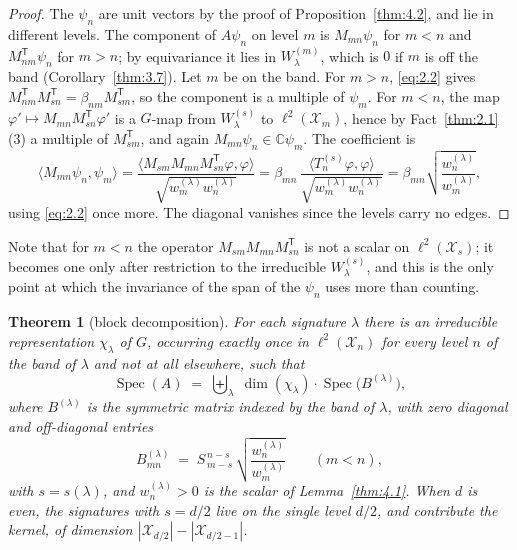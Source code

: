 \documentclass[11pt]{article}
\numberwithin{equation}{section}
\theoremstyle{plain}
\newtheorem{theorem}{Theorem}[section]
\theoremstyle{definition}
\begin{document}
\begin{proof}
The $\psi_n$ are unit vectors by the proof of Proposition~\ref{thm:4.2}, and lie in
different levels. The component of $A\psi_n$ on level $m$ is $M_{mn}\psi_n$ for $m<n$
and $M_{nm}^{\mathsf T}\psi_n$ for $m>n$; by equivariance it lies in
$W^{(m)}_\lambda$, which is $0$ if $m$ is off the band (Corollary~\ref{thm:3.7}). Let $m$ be on
the band. For $m>n$, \eqref{eq:2.2} gives
$M_{nm}^{\mathsf T}M_{sn}^{\mathsf T}=\beta_{nm}M_{sm}^{\mathsf T}$, so the
component is a multiple of $\psi_m$. For $m<n$, the map
$\varphi'\mapsto M_{mn}M_{sn}^{\mathsf T}\varphi'$ is a $G$-map from
$W^{(s)}_\lambda$ to $\ell^2(\mathcal{X}_m)$, hence by Fact~\ref{thm:2.1}(3) a multiple of
$M_{sm}^{\mathsf T}$, and again $M_{mn}\psi_n\in\mathbb{C}\psi_m$. The coefficient is
\[
\langle M_{mn}\psi_n,\psi_m\rangle
=\frac{\langle M_{sm}M_{mn}M_{sn}^{\mathsf T}\varphi,\varphi\rangle}
{\sqrt{w^{(\lambda)}_mw^{(\lambda)}_n}}
=\beta_{mn}\,\frac{\langle T^{(s)}_n\varphi,\varphi\rangle}
{\sqrt{w^{(\lambda)}_mw^{(\lambda)}_n}}
=\beta_{mn}\sqrt{\frac{w^{(\lambda)}_n}{w^{(\lambda)}_m}},
\]
using \eqref{eq:2.2} once more. The diagonal vanishes since the levels carry no edges.
\end{proof}

Note that for $m<n$ the operator $M_{sm}M_{mn}M_{sn}^{\mathsf T}$ is not a scalar on
$\ell^2(\mathcal{X}_{s})$; it becomes one only after restriction to the irreducible
$W^{(s)}_\lambda$, and this is the only point at which the invariance of the span of
the $\psi_n$ uses more than counting.

\begin{theorem}[block decomposition]\label{thm:4.4}
For each signature $\lambda$ there is an
irreducible representation $\chi_\lambda$ of $G$, occurring exactly once in
$\ell^2(\mathcal{X}_n)$ for every level $n$ of the band of $\lambda$ and not at all elsewhere,
such that
\[
\operatorname{Spec}(A)\;=\;\biguplus_{\lambda}\;\dim(\chi_\lambda)\cdot
\operatorname{Spec}\bigl(B^{(\lambda)}\bigr),
\]
where $B^{(\lambda)}$ is the symmetric matrix indexed by the band of $\lambda$, with
zero diagonal and off-diagonal entries
\[
B^{(\lambda)}_{mn}\;=\;S^{\,n-s}_{\,m-s}\,
\sqrt{\frac{w^{(\lambda)}_n}{w^{(\lambda)}_m}}\qquad(m<n),
\]
with $s=s(\lambda)$, and $w^{(\lambda)}_n>0$ is the scalar of Lemma~\ref{thm:4.1}. When $d$ is even, the signatures with $s=d/2$ live
on the single level $d/2$, and contribute the kernel, of dimension
$|\mathcal{X}_{d/2}|-|\mathcal{X}_{d/2-1}|$.
\end{theorem}
\end{document}
